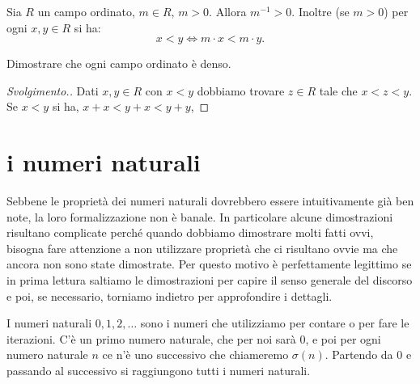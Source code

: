 \begin{exercise}
Sia $R$ un campo ordinato, $m\in R$, $m>0$.
Allora $m^{-1}>0$.
Inoltre (se $m>0$) per ogni $x,y\in R$ si ha:
\[
  x<y \iff m\cdot x < m\cdot y.
\]
\end{exercise}

\begin{exercise}
Dimostrare che ogni campo ordinato è denso.
\end{exercise}
\begin{proof}[Svolgimento.]
Dati $x,y\in R$ con $x<y$ dobbiamo trovare $z\in R$ tale che $x<z<y$.
Se $x<y$ si ha, $x+x<y+x<y+y$, 
\end{proof}


\section{i numeri naturali}
\label{sec:naturali}

Sebbene le proprietà dei numeri naturali dovrebbero essere intuitivamente già ben note,
la loro formalizzazione non è banale.
In particolare alcune dimostrazioni risultano complicate perché quando dobbiamo dimostrare 
molti fatti ovvi, bisogna fare attenzione a non utilizzare proprietà che ci risultano ovvie 
ma che ancora non sono state dimostrate.
Per questo motivo è perfettamente legittimo se in prima lettura saltiamo le dimostrazioni 
per capire il senso generale del discorso e poi, se necessario, torniamo indietro per
approfondire i dettagli.

I numeri naturali $0,1,2,\dots$ sono i numeri che utilizziamo per contare o per 
fare le iterazioni. C'è un primo numero naturale, che per noi sarà $0$, e poi
per ogni numero naturale $n$ ce n'è uno successivo che chiameremo $\sigma(n)$. 
Partendo da $0$ e passando al successivo si raggiungono tutti i numeri naturali.


